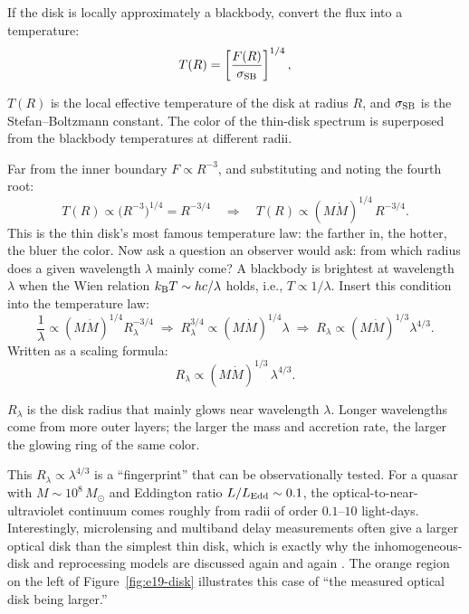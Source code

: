 If the disk is locally approximately a blackbody, convert the flux into a temperature:
\begin{equation}
  T(R)=\left[\frac{F(R)}{\sigma_{\rm SB}}\right]^{1/4},
  \label{eq:e19-temp}
\end{equation}
\begin{formulaexplain}
\(T(R)\) is the local effective temperature of the disk at radius \(R\), and \(\sigma_{\rm SB}\) is the Stefan--Boltzmann constant. The color of the thin-disk spectrum is superposed from the blackbody temperatures at different radii.
\end{formulaexplain}
Far from the inner boundary \(F\propto R^{-3}\), and substituting and noting the fourth root:
\[
  T(R)\propto \big(R^{-3}\big)^{1/4}=R^{-3/4}
  \quad\Longrightarrow\quad
  T(R)\propto (M\dot M)^{1/4}\,R^{-3/4}.
\]
This is the thin disk's most famous temperature law: the farther in, the hotter, the bluer the color. Now ask a question an observer would ask: from which radius does a given wavelength \(\lambda\) mainly come? A blackbody is brightest at wavelength \(\lambda\) when the Wien relation \(k_{\rm B}T\sim hc/\lambda\) holds, i.e., \(T\propto1/\lambda\). Insert this condition into the temperature law:
\[
  \frac{1}{\lambda}\propto (M\dot M)^{1/4}R_\lambda^{-3/4}
  \;\Longrightarrow\;
  R_\lambda^{3/4}\propto (M\dot M)^{1/4}\lambda
  \;\Longrightarrow\;
  R_\lambda\propto (M\dot M)^{1/3}\lambda^{4/3}.
\]
Written as a scaling formula:
\begin{equation}
  R_\lambda \propto (M\dot M)^{1/3}\,\lambda^{4/3}.
  \label{eq:e19-Rlambda}
\end{equation}
\begin{formulaexplain}
\(R_\lambda\) is the disk radius that mainly glows near wavelength \(\lambda\). Longer wavelengths come from more outer layers; the larger the mass and accretion rate, the larger the glowing ring of the same color.
\end{formulaexplain}
This \(R_\lambda\propto\lambda^{4/3}\) is a ``fingerprint'' that can be observationally tested. For a quasar with \(M\sim10^8\,M_\odot\) and Eddington ratio \(L/L_{\rm Edd}\sim0.1\), the optical-to-near-ultraviolet continuum comes roughly from radii of order \(0.1\)--\(10\) light-days. Interestingly, microlensing and multiband delay measurements often give a larger optical disk than the simplest thin disk, which is exactly why the inhomogeneous-disk and reprocessing models are discussed again and again \citep{1973A&A....24..337S,2006ApJ...642...87P,2011ApJ...727L..24D}. The orange region on the left of Figure~\ref{fig:e19-disk} illustrates this case of ``the measured optical disk being larger.''

